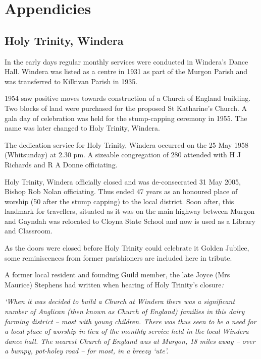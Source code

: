 \balance


\backmatter
\chapter{Appendicies}
\nobalance


\section{Holy Trinity, Windera}



In the early days regular monthly services were conducted in Windera's Dance Hall. Windera was listed as a centre in 1931 as part of the Murgon Parish and was transferred to Kilkivan Parish in 1935.



1954 saw positive moves towards construction of a Church of England building. Two blocks of land were purchased for the proposed St Katharine's Church. A gala day of celebration was held for the stump-capping ceremony in 1955. The name was later changed to Holy Trinity, Windera.



The dedication service for Holy Trinity, Windera occurred on the 25 May 1958 (Whitsunday) at 2.30 pm. A sizeable congregation of 280 attended with H J Richards and R A Donne officiating.



Holy Trinity, Windera officially closed and was de-consecrated 31 May 2005, Bishop Rob Nolan officiating. Thus ended 47 years as an honoured place of worship (50 after the stump capping) to the local district. Soon after, this landmark for travellers, situated as it was on the main highway between Murgon and Gayndah was relocated to Cloyna State School and now is used as a Library and Classroom.



As the doors were closed before Holy Trinity could celebrate it Golden Jubilee, some reminiscences from former parishioners are included here in tribute.



A former local resident and founding Guild member, the late Joyce (Mrs Maurice) Stephens had written when hearing of Holy Trinity's closure\emph{:}



\emph{`When it was decided to build a Church at Windera there was a significant number of Anglican (then known as Church of England) families in this dairy farming district -- most with young children. There was thus seen to be a need for a local place of worship in lieu of the monthly service held in the local Windera dance hall. The nearest Church of England was at Murgon, 18 miles away -- over a bumpy, pot-holey road -- for most, in a breezy `ute'.}



